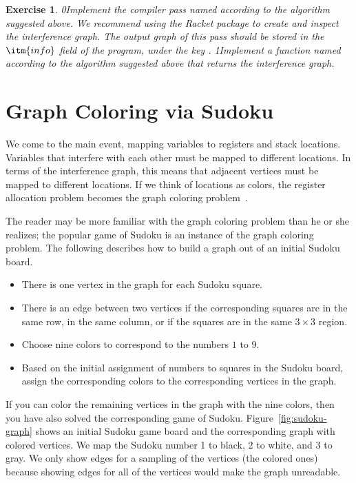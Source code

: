\documentclass[7x10]{TimesAPriori_MIT}%
\def\racketEd{0}
\def\pythonEd{1}
\def\edition{1}
\newcommand{\racket}[1]{{\if\edition\racketEd{#1}\fi}}
\newcommand{\python}[1]{{\if\edition\pythonEd #1\fi}}
\newtheorem{exercise}[theorem]{Exercise}
\begin{document}
\begin{exercise}\normalfont
\racket{Implement the compiler pass named \code{build\_interference} according
to the algorithm suggested above. We recommend using the Racket
  \code{graph} package to create and inspect the interference graph.
The output graph of this pass should be stored in the $\itm{info}$ field of
the program, under the key \code{conflicts}.}
%
\python{Implement a function named 
  according to the algorithm suggested above that
  returns the interference graph.}
\end{exercise}

  
\section{Graph Coloring via Sudoku}
\label{sec:graph-coloring}

We come to the main event, mapping variables to registers and stack
locations. Variables that interfere with each other must be mapped to
different locations.  In terms of the interference graph, this means
that adjacent vertices must be mapped to different locations.  If we
think of locations as colors, the register allocation problem becomes
the graph coloring problem~\citep{Balakrishnan:1996ve,Rosen:2002bh}.

The reader may be more familiar with the graph coloring problem than he
or she realizes; the popular game of Sudoku is an instance of the
graph coloring problem. The following describes how to build a graph
out of an initial Sudoku board.
\begin{itemize}
\item There is one vertex in the graph for each Sudoku square.
\item There is an edge between two vertices if the corresponding squares
  are in the same row, in the same column, or if the squares are in
  the same $3\times 3$ region.
\item Choose nine colors to correspond to the numbers $1$ to $9$.
\item Based on the initial assignment of numbers to squares in the
  Sudoku board, assign the corresponding colors to the corresponding
  vertices in the graph.
\end{itemize}
If you can color the remaining vertices in the graph with the nine
colors, then you have also solved the corresponding game of Sudoku.
Figure~\ref{fig:sudoku-graph} shows an initial Sudoku game board and
the corresponding graph with colored vertices.  We map the Sudoku
number 1 to black, 2 to white, and 3 to gray.  We only show edges for a
sampling of the vertices (the colored ones) because showing edges for
all of the vertices would make the graph unreadable.
\end{document}
